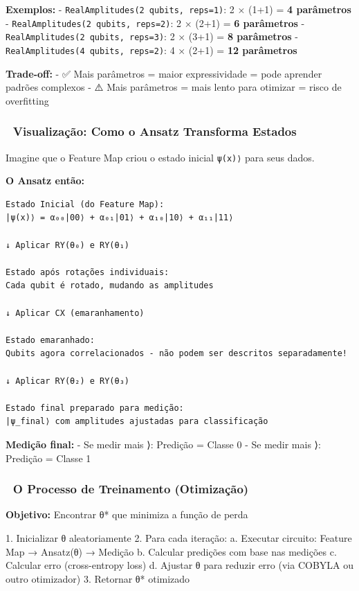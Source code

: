 \documentclass[
  brazilian,
]{report}
\newenvironment{Shaded}{\begin{snugshade}}{\end{snugshade}}
\newcommand{\FloatTok}[1]{\textcolor[rgb]{0.68,0.00,0.00}{#1}}
\newcommand{\NormalTok}[1]{\textcolor[rgb]{0.00,0.23,0.31}{#1}}
\newcommand{\OperatorTok}[1]{\textcolor[rgb]{0.37,0.37,0.37}{#1}}
\begin{document}
\textbf{Exemplos:} - \texttt{RealAmplitudes(2\ qubits,\ reps=1)}: 2 ×
(1+1) = \textbf{4 parâmetros} -
\texttt{RealAmplitudes(2\ qubits,\ reps=2)}: 2 × (2+1) = \textbf{6
parâmetros} - \texttt{RealAmplitudes(2\ qubits,\ reps=3)}: 2 × (3+1) =
\textbf{8 parâmetros} - \texttt{RealAmplitudes(4\ qubits,\ reps=2)}: 4 ×
(2+1) = \textbf{12 parâmetros}

\textbf{Trade-off:} - ✅ Mais parâmetros = maior expressividade = pode
aprender padrões complexos - ⚠️ Mais parâmetros = mais lento para
otimizar = risco de overfitting

\subsubsection{🎨 Visualização: Como o Ansatz Transforma
Estados}\label{visualizauxe7uxe3o-como-o-ansatz-transforma-estados}

Imagine que o Feature Map criou o estado inicial
\texttt{\textbar{}ψ(x)⟩} para seus dados.

\textbf{O Ansatz então:}

\begin{verbatim}
Estado Inicial (do Feature Map):
|ψ(x)⟩ = α₀₀|00⟩ + α₀₁|01⟩ + α₁₀|10⟩ + α₁₁|11⟩

↓ Aplicar RY(θ₀) e RY(θ₁)

Estado após rotações individuais:
Cada qubit é rotado, mudando as amplitudes

↓ Aplicar CX (emaranhamento)

Estado emaranhado:
Qubits agora correlacionados - não podem ser descritos separadamente!

↓ Aplicar RY(θ₂) e RY(θ₃)

Estado final preparado para medição:
|ψ_final⟩ com amplitudes ajustadas para classificação
\end{verbatim}

\textbf{Medição final:} - Se medir mais ⟩: Predição = Classe 0
- Se medir mais ⟩: Predição = Classe 1

\subsubsection{🔄 O Processo de Treinamento
(Otimização)}\label{o-processo-de-treinamento-otimizauxe7uxe3o}

\textbf{Objetivo:} Encontrar θ* que minimiza a função de perda

\begin{Shaded}
\begin{Highlighting}[]
\FloatTok{1.}\NormalTok{ Inicializar θ aleatoriamente}
\FloatTok{2.}\NormalTok{ Para cada iteração:}
\NormalTok{   a. Executar circuito: Feature Map → Ansatz(θ) → Medição}
\NormalTok{   b. Calcular predições com base nas medições}
\NormalTok{   c. Calcular erro (cross}\OperatorTok{{-}}\NormalTok{entropy loss)}
\NormalTok{   d. Ajustar θ para reduzir erro (via COBYLA ou outro otimizador)}
\FloatTok{3.}\NormalTok{ Retornar θ}\OperatorTok{*}\NormalTok{ otimizado}
\end{Highlighting}
\end{Shaded}
\end{document}
